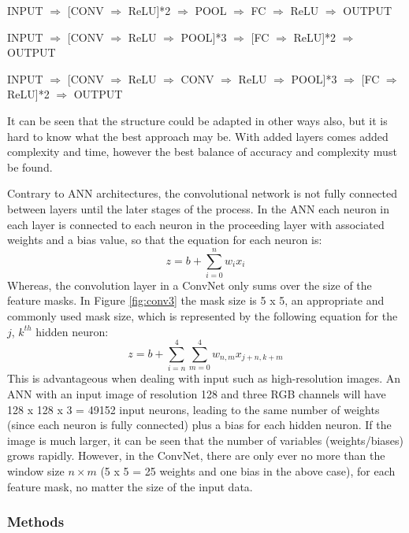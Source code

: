 \documentclass[fleqn,twoside,12pt]{report}
\begin{document}
INPUT $\Rightarrow$ [CONV $\Rightarrow$ ReLU]*2  $\Rightarrow$ POOL $\Rightarrow$ FC $\Rightarrow$ ReLU $\Rightarrow$ OUTPUT

INPUT $\Rightarrow$ [CONV $\Rightarrow$ ReLU $\Rightarrow$ POOL]*3  $\Rightarrow$ [FC $\Rightarrow$ ReLU]*2 $\Rightarrow$ OUTPUT

INPUT $\Rightarrow$ [CONV $\Rightarrow$ ReLU $\Rightarrow$ CONV $\Rightarrow$ ReLU $\Rightarrow$ POOL]*3  $\Rightarrow$ [FC $\Rightarrow$ ReLU]*2 $\Rightarrow$ OUTPUT

It can be seen that the structure could be adapted in other ways also, but it is hard to know what the best approach may be. With added layers comes added complexity and time, however the best balance of accuracy and complexity must be found.


Contrary to ANN architectures, the convolutional network is not fully connected between layers until the later stages of the process. In the ANN each neuron in each layer is connected to each neuron in the proceeding layer with associated weights and a bias value, so that the equation for each neuron is:
\begin{equation}
z = b + \sum_{i=0}^{n} w_i x_i
\end{equation}
Whereas, the convolution layer in a ConvNet only sums over the size of the feature masks. In Figure \ref{fig:conv3} the mask size is 5 x 5, an appropriate and commonly used mask size, which is represented by the following equation for the $j$, $k^{th}$ hidden neuron:
\begin{equation}
z = b + \sum_{i=n}^{4} \sum_{m=0}^{4} w_{n,m}  x_{j+n,k+m}
\end{equation}
This is advantageous when dealing with input such as high-resolution images. An ANN with an input image of resolution 128 and three RGB channels will have 128 x 128 x 3 = 49152 input neurons, leading to the same number of weights (since each neuron is fully connected) plus a bias for each hidden neuron. If the image is much larger, it can be seen that the number of variables (weights/biases) grows rapidly. However, in the ConvNet, there are only ever no more than the window size $n \times m$ (5 x 5 = 25 weights and one bias in the above case), for each feature mask, no matter the size of the input data.


\subsubsection{Methods}
\end{document}
